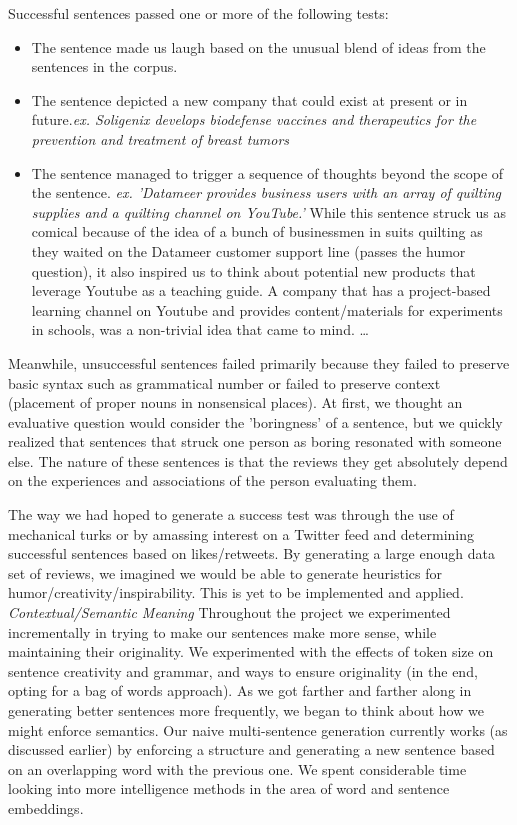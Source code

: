 \documentclass[11pt]{article}
\begin{document}
Successful sentences passed one or more of the following tests:
\begin{itemize}

        \item The sentence made us laugh based on the unusual blend of ideas from the sentences in the corpus.

        \item The sentence depicted a new company that could exist at present or in future.\textit{ex. Soligenix develops biodefense vaccines and therapeutics for the prevention and treatment of breast tumors} 

        \item The sentence managed to trigger a sequence of thoughts beyond the scope of the sentence. \textit{ex. 'Datameer provides business users with an array of quilting supplies and a quilting channel on YouTube.'} While this sentence struck us as comical because of the idea of a bunch of businessmen in suits quilting as they waited on the Datameer customer support line (passes the humor question), it also inspired us to think about potential new products that leverage Youtube as a teaching guide. A company that has a project-based learning channel on Youtube and provides content/materials for experiments in schools, was a non-trivial idea that came to mind. \ldots 

\end{itemize}

Meanwhile, unsuccessful sentences failed primarily because they failed to preserve basic syntax such as grammatical number or failed to preserve context (placement of proper nouns in nonsensical places). At first, we thought an evaluative question would consider the 'boringness' of a sentence, but we quickly realized that sentences that struck one person as boring resonated with someone else. The nature of these sentences is that the reviews they get absolutely depend on the experiences and associations of the person evaluating them. 

The way we had hoped to generate a success test was through the use of mechanical turks or by amassing interest on a Twitter feed and determining successful sentences based on likes/retweets. By generating a large enough data set of reviews, we imagined we would be able to generate heuristics for humor/creativity/inspirability. This is yet to be implemented and applied. 
\newline
\textit{Contextual/Semantic Meaning }
\newline
Throughout the project we experimented incrementally in trying to make our sentences make more sense, while maintaining their originality. We experimented with the effects of token size on sentence creativity and grammar, and ways to ensure originality (in the end, opting for a bag of words approach). As we got farther and farther along in generating better sentences more frequently, we began to think about how we might enforce semantics. Our naive multi-sentence generation currently works (as discussed earlier) by enforcing a structure and generating a new sentence based on an overlapping word with the previous one. We spent considerable time looking into more intelligence methods in the area of word and sentence embeddings.
\end{document}
